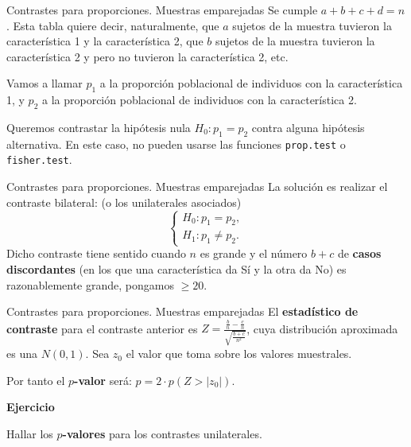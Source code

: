 \documentclass[
  ignorenonframetext,
]{beamer}
\begin{document}
\begin{frame}[fragile]{Contrastes para proporciones. Muestras
emparejadas}
\protect\hypertarget{contrastes-para-proporciones.-muestras-emparejadas}{}
Se cumple \(a+b+c+d=n\). Esta tabla quiere decir, naturalmente, que
\(a\) sujetos de la muestra tuvieron la característica 1 y la
característica 2, que \(b\) sujetos de la muestra tuvieron la
característica 2 y pero no tuvieron la característica 2, etc.

Vamos a llamar \(p_{1}\) a la proporción poblacional de individuos con
la característica 1, y \(p_{2}\) a la proporción poblacional de
individuos con la característica 2.

Queremos contrastar la hipótesis nula \(H_{0}:p_1=p_2\) contra alguna
hipótesis alternativa. En este caso, no pueden usarse las funciones
\texttt{prop.test} o \texttt{fisher.test}.
\end{frame}

\begin{frame}{Contrastes para proporciones. Muestras emparejadas}
\protect\hypertarget{contrastes-para-proporciones.-muestras-emparejadas-1}{}
La solución es realizar el contraste bilateral: (o los unilaterales
asociados) \[
\left\{\begin{array}{l}
H_{0}:p_1=p_2,\\
H_{1}:p_1\neq p_2.
\end{array}\right.
\] Dicho contraste tiene sentido cuando \(n\) es grande y el número
\(b+c\) de \textbf{casos discordantes} (en los que una característica da
Sí y la otra da No) es razonablemente grande, pongamos \(\geq 20\).
\end{frame}

\begin{frame}{Contrastes para proporciones. Muestras emparejadas}
\protect\hypertarget{contrastes-para-proporciones.-muestras-emparejadas-2}{}
El \textbf{estadístico de contraste} para el contraste anterior es
\(Z=\frac{\frac{b}{n}-\frac{c}{n}}{\sqrt{\frac{b+c}{n^2}}}\), cuya
distribución aproximada es una \(N(0,1)\). Sea \(z_0\) el valor que toma
sobre los valores muestrales.

Por tanto el \textbf{\(p\)-valor} será: \(p=2\cdot p(Z > |z_0|)\).

\textbf{Ejercicio}

Hallar los \textbf{\(p\)-valores} para los contrastes unilaterales.
\end{frame}
\end{document}
